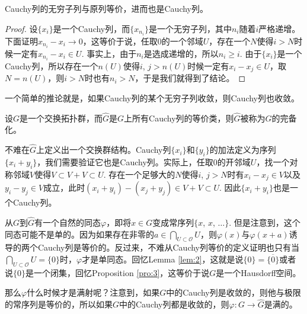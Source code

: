 \begin{lem}
	Cauchy列的无穷子列与原列等价，进而也是Cauchy列。
\end{lem}

\begin{proof}
	设$\{x_i\}$是一个Cauchy列，而$\{x_{n_i}\}$是一个无穷子列，其中$n_i$随着$i$严格递增。下面证明$x_{n_i}-x_i\to 0$，这等价于说，任取$0$的一个邻域$U$，存在一个$N$使得$i>N$时候一定有$x_{n_i}-x_{i}\in U$. 事实上，由于$n_i$是选成递增的，所以$n_i\geq i$. 由于$\{x_i\}$是一个Cauchy列，所以存在一个$n(U)$使得$i$, $j>n(U)$时候一定有$x_i-x_j\in U$，取$N=n(U)$，则$i>N$时也有$n_i>N$，于是我们就得到了结论。
\end{proof}

一个简单的推论就是，如果Cauchy列的某个无穷子列收敛，则Cauchy列也收敛。

\begin{para}
	设$G$是一个交换拓扑群，而$\hat G$是$G$上所有Cauchy列的等价类，则$\hat G$被称为$G$的完备化。

	不难在$\hat G$上定义出一个交换群结构。Cauchy列$\{x_i\}$和$\{y_i\}$的加法定义为序列$\{x_i+y_i\}$，我们需要验证它也是Cauchy列。实际上，任取$0$的开邻域$U$，找一个对称邻域$V$使得$V\subset V+V\subset U$. 存在一个足够大的$N$使得$i$, $j>N$时有$x_i-x_j\in V$以及$y_i-y_j\in V$成立，此时$(x_i+y_i)-(x_j+y_j)\in V+V\subset U$. 因此$\{x_i+y_i\}$也是一个Cauchy列。

	从$G$到$\hat G$有一个自然的同态$\varphi$，即将$x\in G$变成常序列$\{x$, $x$, $\dots\}$. 但是注意到，这个同态可能不是单的。因为如果存在非零的$a\in\bigcap_{U\subset \mathscr{O}}U$，则$\varphi(x)$与$\varphi(x+a)$诱导的两个Cauchy列是等价的。反过来，不难从Cauchy列等价的定义证明也只有当$\bigcap_{U\subset \mathscr{O}}U=\{0\}$时，$\varphi$才是单同态。回忆Lemma \ref{lem:2}，这就是说$\{0\}=\overline{\{0\}}$或者说$\{0\}$是一个闭集，回忆Proposition \ref{pro:3}，这等价于说$G$是一个Hausdorff空间。

	那么$\varphi$什么时候才是满射呢？注意到，如果$G$中的Cauchy列是收敛的，则他与极限的常序列是等价的，所以如果$G$中的Cauchy列都是收敛的，则$\varphi:G\to \hat{G}$是满的。
\end{para}

